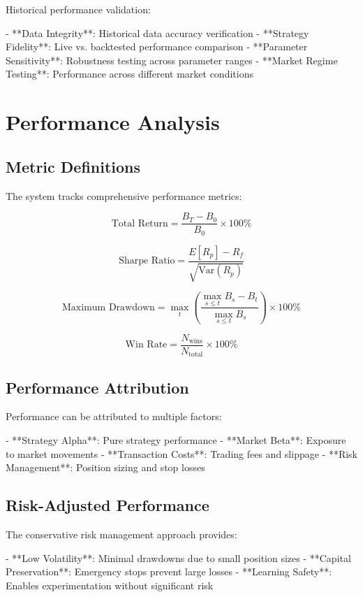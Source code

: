 \documentclass[12pt,a4paper]{article}
\begin{document}
Historical performance validation:

- **Data Integrity**: Historical data accuracy verification
- **Strategy Fidelity**: Live vs. backtested performance comparison
- **Parameter Sensitivity**: Robustness testing across parameter ranges
- **Market Regime Testing**: Performance across different market conditions

\section{Performance Analysis}

\subsection{Metric Definitions}

The system tracks comprehensive performance metrics:

\[
\text{Total Return} = \frac{B_T - B_0}{B_0} \times 100\%
\]

\[
\text{Sharpe Ratio} = \frac{E[R_p] - R_f}{\sqrt{\text{Var}(R_p)}}
\]

\[
\text{Maximum Drawdown} = \max_t \left( \frac{\max_{s \leq t} B_s - B_t}{\max_{s \leq t} B_s} \right) \times 100\%
\]

\[
\text{Win Rate} = \frac{N_{\text{wins}}}{N_{\text{total}}} \times 100\%
\]

\subsection{Performance Attribution}

Performance can be attributed to multiple factors:

- **Strategy Alpha**: Pure strategy performance
- **Market Beta**: Exposure to market movements
- **Transaction Costs**: Trading fees and slippage
- **Risk Management**: Position sizing and stop losses

\subsection{Risk-Adjusted Performance}

The conservative risk management approach provides:

- **Low Volatility**: Minimal drawdowns due to small position sizes
- **Capital Preservation**: Emergency stops prevent large losses
- **Learning Safety**: Enables experimentation without significant risk
\end{document}
